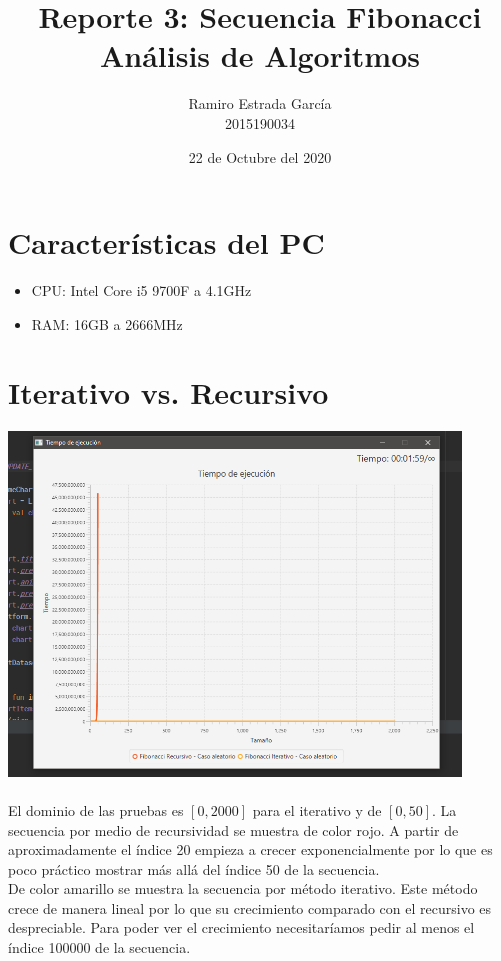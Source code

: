 \documentclass{article}
\title{Reporte 3: Secuencia Fibonacci\\\textbf{Análisis de Algoritmos}}
\author{ Ramiro Estrada García\\2015190034 }
\date{22 de Octubre del 2020}
\begin{document}
\maketitle
\vspace{5cm}
\section {Características del PC}
\begin{itemize}
	\item CPU: Intel Core i5 9700F a 4.1GHz
	\item RAM: 16GB a 2666MHz
\end{itemize}
\newpage
\maketitle
\section{Iterativo vs. Recursivo}
\includegraphics[width=12cm]{grafica.png}
\\ \\
El dominio de las pruebas es $[0, 2000]$ para el iterativo y de $[0, 50]$. 
La secuencia por medio de recursividad se muestra de color rojo. A partir de
aproximadamente el índice 20 empieza a crecer exponencialmente por lo que es
poco práctico mostrar más allá del índice 50 de la secuencia.\\
De color amarillo se muestra la secuencia por método iterativo. Este método
crece de manera lineal por lo que su crecimiento comparado con el recursivo
es despreciable. Para poder ver el crecimiento necesitaríamos pedir al menos
el índice 100000 de la secuencia.
\end{document}
